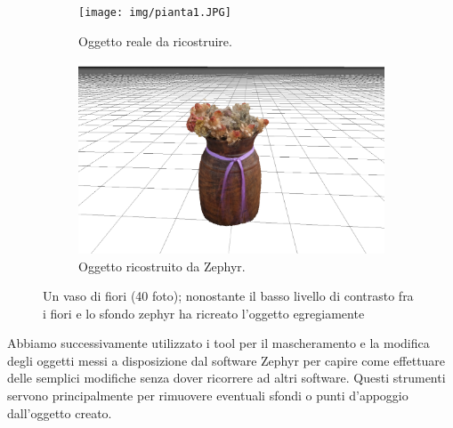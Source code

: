 \documentclass[12pt]{report}
\begin{document}
\begin{figure}[H]
  \centering
  \begin{subfigure}[b]{0.365\linewidth}
    \centering
    \texttt{[image: img/pianta1.JPG]}
    \caption{Oggetto reale da ricostruire.}
  \end{subfigure}
  \begin{subfigure}[b]{0.4\linewidth}
    \centering
    \includegraphics[width=\linewidth]{img/pianta.png}
    \caption{Oggetto ricostruito da Zephyr.}
  \end{subfigure}
  \captionsetup{justification=centering}
  \caption{Un vaso di fiori (40 foto); nonostante il basso livello di contrasto fra i fiori e lo sfondo zephyr ha ricreato l'oggetto egregiamente}
\end{figure}
Abbiamo successivamente utilizzato i tool per il mascheramento e la modifica degli oggetti messi a disposizione dal software Zephyr per capire come effettuare delle semplici modifiche senza dover ricorrere ad altri software.
Questi strumenti servono principalmente per rimuovere eventuali sfondi o punti d'appoggio dall'oggetto creato.
\end{document}
